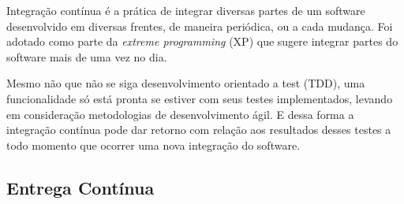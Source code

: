 Integração contínua é a prática de integrar diversas partes de um software
desenvolvido em diversas frentes, de maneira periódica, ou a cada mudança.
Foi adotado como parte da \textit{extreme programming} (XP) que sugere integrar
partes do software mais de uma vez no dia.

Mesmo não que não se siga desenvolvimento orientado a test (TDD), uma
funcionalidade só está pronta se estiver com seus testes implementados,
levando em consideração metodologias de desenvolvimento ágil. E dessa
forma a integração contínua pode dar retorno com relação aos resultados desses
testes a todo momento que ocorrer uma nova integração do software.

\subsection{Entrega Contínua}

